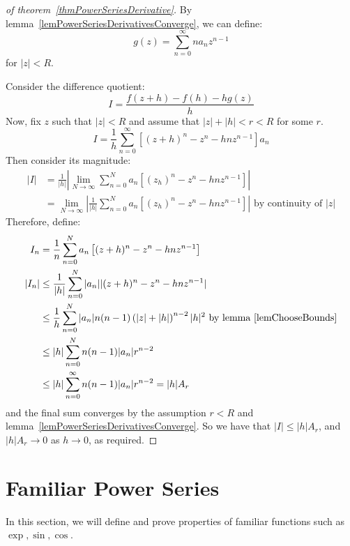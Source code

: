 \documentclass[../Main.tex]{subfiles}
\begin{document}
\begin{proof}[of theorem~\ref{thmPowerSeriesDerivative}]
    By lemma~\ref{lemPowerSeriesDerivativesConverge}, we can define:
    \begin{equation*}
        g(z) = \sum_{n=0}^\infty na_n z^{n-1}
    \end{equation*}
    for $|z| < R$.\par
    Consider the difference quotient:
    \begin{equation*}
        I = \frac{f(z + h) - f(h) - hg(z)}{h}
    \end{equation*}
    Now, fix $z$ such that $|z| < R$ and assume that $|z| + |h| < r < R$ for some $r$.
    \begin{equation*}
        I = \frac{1}{h} \sum_{n = 0}^\infty \left[(z + h)^n - z^n - hnz^{n-1}\right]a_n
    \end{equation*}
    Then consider its magnitude:
    \begin{align*}
        |I| &= \frac{1}{|h|} \left|\lim_{N \to \infty} \sum_{n = 0}^N a_n\left[(z _ h)^n - z^n - hnz^{n-1}\right]\right| \\
        &= \lim_{N \to \infty} \left|\frac{1}{|h|} \sum_{n = 0}^N a_n\left[(z _ h)^n - z^n - hnz^{n-1}\right]\right| \text{ by continuity of } |z|
    \end{align*}
    Therefore, define:
    \begin{align*}
        I_n &= \frac{1}{n} \sum_{n = 0}^N a_n \left[(z + h)^n - z^n - hnz^{n-1}\right] \\
       |I_n| &\leq \frac{1}{|h|} \sum_{n = 0}^N |a_n| |(z + h)^n - z^n - hnz^{n-1}| \\
       &\leq \frac{1}{h} \sum_{n = 0}^N |a_n| n(n-1) \left(|z| + |h|\right)^{n-2} |h|^2 \text{ by lemma~\ref{lemChooseBounds}}\\
       &\leq |h| \sum_{n = 0}^N n(n-1) |a_n| r^{n-2} \\
       &\leq |h| \sum_{n = 0}^\infty n(n-1) |a_n| r^{n-2} = |h| A_r
    \end{align*}
    and the final sum converges by the assumption $r < R$ and lemma~\ref{lemPowerSeriesDerivativesConverge}.
    So we have that $|I| \leq |h| A_r$, and $|h| A_r \to 0$ as $h \to 0$, as required.
\end{proof}
\section{Familiar Power Series}
In this section, we will define and prove properties of familiar functions such as $\exp, \sin, \cos$.
\end{document}
